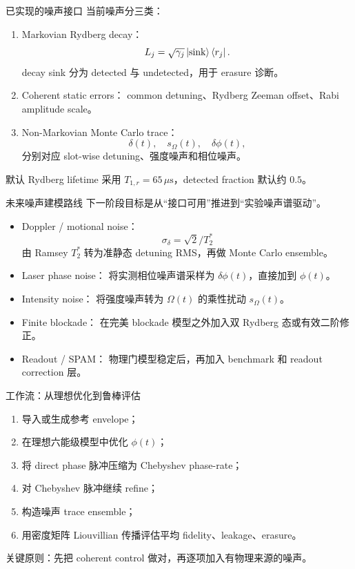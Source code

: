 \documentclass[aspectratio=169,11pt]{ctexbeamer}
\begin{document}
\begin{frame}{已实现的噪声接口}
  当前噪声分三类：

  \begin{enumerate}
    \item Markovian Rydberg decay：
      \[
      L_j=\sqrt{\gamma_j}\ket{\mathrm{sink}}\bra{r_j}.
      \]
      decay sink 分为 detected 与 undetected，用于 erasure 诊断。

    \item Coherent static errors：
      common detuning、Rydberg Zeeman offset、Rabi amplitude scale。

    \item Non-Markovian Monte Carlo trace：
      \[
      \delta(t),\quad s_\Omega(t),\quad \delta\phi(t),
      \]
      分别对应 slot-wise detuning、强度噪声和相位噪声。
  \end{enumerate}

  默认 Rydberg lifetime 采用 \(T_{1,r}=65\,\mu\mathrm{s}\)，detected fraction 默认约 \(0.5\)。
\end{frame}

\begin{frame}{未来噪声建模路线}
  下一阶段目标是从“接口可用”推进到“实验噪声谱驱动”。

  \begin{itemize}
    \item Doppler / motional noise：
      \[
      \sigma_\delta=\sqrt{2}/T_2^*
      \]
      由 Ramsey \(T_2^*\) 转为准静态 detuning RMS，再做 Monte Carlo ensemble。
    \item Laser phase noise：
      将实测相位噪声谱采样为 \(\delta\phi(t)\)，直接加到 \(\phi(t)\)。
    \item Intensity noise：
      将强度噪声转为 \(\Omega(t)\) 的乘性扰动 \(s_\Omega(t)\)。
    \item Finite blockade：
      在完美 blockade 模型之外加入双 Rydberg 态或有效二阶修正。
    \item Readout / SPAM：
      物理门模型稳定后，再加入 benchmark 和 readout correction 层。
  \end{itemize}
\end{frame}

\begin{frame}{工作流：从理想优化到鲁棒评估}
  \begin{enumerate}
    \item 导入或生成参考 envelope；
    \item 在理想六能级模型中优化 \(\phi(t)\)；
    \item 将 direct phase 脉冲压缩为 Chebyshev phase-rate；
    \item 对 Chebyshev 脉冲继续 refine；
    \item 构造噪声 trace ensemble；
    \item 用密度矩阵 Liouvillian 传播评估平均 fidelity、leakage、erasure。
  \end{enumerate}

  \vspace{0.7em}
  关键原则：先把 coherent control 做对，再逐项加入有物理来源的噪声。
\end{frame}
\end{document}
